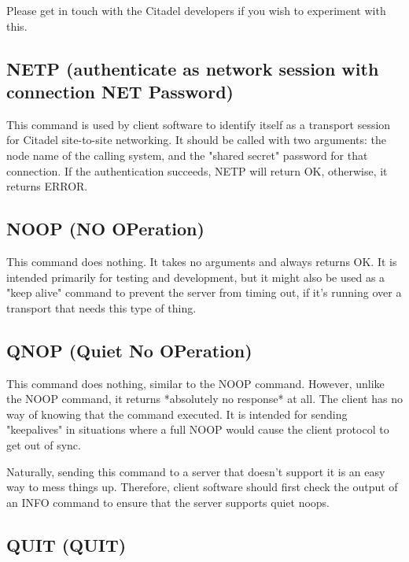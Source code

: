  Please get in touch with the Citadel developers if you wish to experiment with
this.



\subsection{NETP (authenticate as network session with connection NET Password)}

 This command is used by client software to identify itself as a transport
session for Citadel site-to-site networking.  It should be called with
two arguments: the node name of the calling system, and the "shared secret"
password for that connection.  If the authentication succeeds, NETP will
return OK, otherwise, it returns ERROR.



\subsection{NOOP (NO OPeration)}

 This command does nothing.  It takes no arguments and always returns
OK.  It is intended primarily for testing and development, but it might also
be used as a "keep alive" command to prevent the server from timing out, if
it's running over a transport that needs this type of thing.



\subsection{QNOP (Quiet No OPeration)}

 This command does nothing, similar to the NOOP command.  However, unlike the
NOOP command, it returns *absolutely no response* at all.  The client has no
way of knowing that the command executed.  It is intended for sending
"keepalives" in situations where a full NOOP would cause the client protocol
to get out of sync.

 Naturally, sending this command to a server that doesn't support it is an
easy way to mess things up.  Therefore, client software should first check
the output of an INFO command to ensure that the server supports quiet noops.



\subsection{QUIT (QUIT)}

